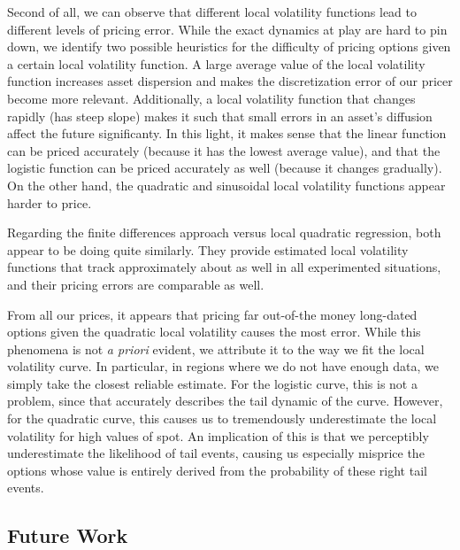 \documentclass[11pt]{article}
\numberwithin{equation}{section}
\begin{document}
Second of all, we can observe that different local volatility functions lead to
different levels of pricing error. While the exact dynamics at play are hard to
pin down, we identify two possible heuristics for the difficulty of pricing
options given a certain local volatility function. A large average value of the
local volatility function increases asset dispersion and makes the
discretization error of our pricer become more relevant. Additionally, a local
volatility function that changes rapidly (has steep slope) makes it such that
small errors in an asset's diffusion affect the future significanty. In this
light, it makes sense that the linear function can be priced accurately (because
it has the lowest average value), and that the logistic function can be priced
accurately as well (because it changes gradually). On the other hand, the
quadratic and sinusoidal local volatility functions appear harder to price.

Regarding the finite differences approach versus local quadratic regression,
both appear to be doing quite similarly. They provide estimated local volatility
functions that track approximately about as well in all experimented situations,
and their pricing errors are comparable as well.

From all our prices, it appears that pricing far out-of-the money long-dated
options given the quadratic local volatility causes the most error. While this
phenomena is not \emph{a priori} evident, we attribute it to the way we fit the
local volatility curve. In particular, in regions where we do not have enough
data, we simply take the closest reliable estimate. For the logistic curve, this
is not a problem, since that accurately describes the tail dynamic of the curve.
However, for the quadratic curve, this causes us to tremendously underestimate
the local volatility for high values of spot. An implication of this is that we
perceptibly underestimate the likelihood of tail events, causing us especially
misprice the options whose value is entirely derived from the probability of
these right tail events.


\subsection{Future Work}
\end{document}
